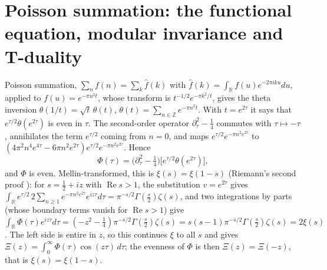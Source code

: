 \documentclass[11pt]{article}
\theoremstyle{definition}\newtheorem{definition}[theorem]{Definition}
\theoremstyle{remark}\newtheorem{remark}[theorem]{Remark}
\newcommand{\R}{\mathbb R}\newcommand{\C}{\mathbb C}\newcommand{\N}{\mathbb N}
\renewcommand{\Re}{\operatorname{Re}}\renewcommand{\Im}{\operatorname{Im}}
\begin{document}
\section{Poisson summation: the functional equation, modular invariance and T-duality}\label{sec:poisson}
Poisson summation, $\sum_nf(n)=\sum_k\hat f(k)$ with $\hat f(k)=\int_\R f(u)e^{-2\pi iku}du$, applied to $f(u)=e^{-\pi u^2t}$, whose transform is $t^{-1/2}e^{-\pi k^2/t}$, gives the theta inversion $\theta(1/t)=\sqrt t\,\theta(t)$, $\theta(t)=\sum_{n\in\mathbb Z}e^{-\pi n^2t}$. With $t=e^{2\tau}$ it says that $e^{\tau/2}\theta(e^{2\tau})$ is even in $\tau$. The second-order operator $\partial_\tau^2-\frac14$ commutes with $\tau\mapsto-\tau$, annihilates the term $e^{\tau/2}$ coming from $n=0$, and maps $e^{\tau/2}e^{-\pi n^2e^{2\tau}}$ to $(4\pi^2n^4e^{4\tau}-6\pi n^2e^{2\tau})e^{\tau/2}e^{-\pi n^2e^{2\tau}}$. Hence
\begin{equation}\label{eq:Phitheta}
\Phi(\tau)=\bigl(\partial_\tau^2-\tfrac14\bigr)\bigl[e^{\tau/2}\theta(e^{2\tau})\bigr],
\end{equation}
and $\Phi$ is even. Mellin-transformed, this is $\xi(s)=\xi(1-s)$ (Riemann's second proof \cite[\S\S2.6, 2.16]{Titchmarsh}): for $s=\frac12+iz$ with $\Re s>1$, the substitution $v=e^{2\tau}$ gives $\int_\R e^{\tau/2}\,2\sum_{n\ge1}e^{-\pi n^2e^{2\tau}}e^{iz\tau}d\tau=\pi^{-s/2}\Gamma(\frac s2)\zeta(s)$, and two integrations by parts (whose boundary terms vanish for $\Re s>1$) give $\int_\R\Phi(\tau)e^{iz\tau}d\tau=(-z^2-\frac14)\pi^{-s/2}\Gamma(\frac s2)\zeta(s)=s(s-1)\pi^{-s/2}\Gamma(\frac s2)\zeta(s)=2\xi(s)$. The left side is entire in $z$, so this continues $\xi$ to all $s$ and gives $\Xi(z)=\int_0^\infty\Phi(\tau)\cos(z\tau)\,d\tau$; the evenness of $\Phi$ is then $\Xi(z)=\Xi(-z)$, that is $\xi(s)=\xi(1-s)$.
\end{document}
